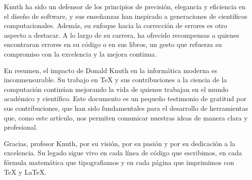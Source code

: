 Knuth ha sido un defensor de los principios de precisión, elegancia y eficiencia en el diseño de software, y sus enseñanzas han inspirado a generaciones de científicos computacionales. Además, su enfoque hacia la corrección de errores es otro aspecto a destacar. A lo largo de su carrera, ha ofrecido recompensas a quienes encontraran errores en su código o en sus libros, un gesto que refuerza su compromiso con la excelencia y la mejora continua.

En resumen, el impacto de Donald Knuth en la informática moderna es inconmensurable. Su trabajo en \TeX{} y sus contribuciones a la ciencia de la computación continúan mejorando la vida de quienes trabajan en el mundo académico y científico. Este documento es un pequeño testimonio de gratitud por sus contribuciones, que han sido fundamentales para el desarrollo de herramientas que, como este artículo, nos permiten comunicar nuestras ideas de manera clara y profesional.

Gracias, profesor Knuth, por su visión, por su pasión y por su dedicación a la excelencia. Su legado sigue vivo en cada línea de código que escribimos, en cada fórmula matemática que tipografiamos y en cada página que imprimimos con \TeX{} y \LaTeX{}.

